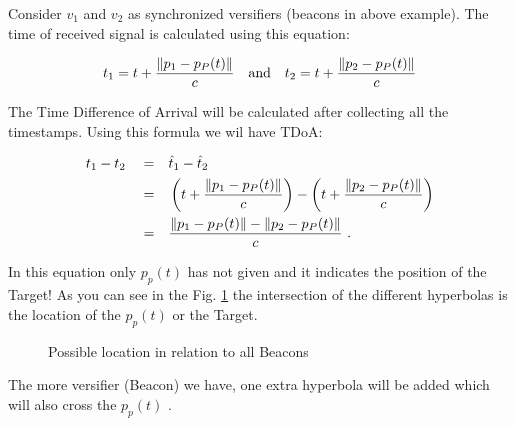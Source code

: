 Consider $v_1$ and $v_2$ as synchronized versifiers (beacons in above example). The time of received signal is calculated using this equation:

\begin{equation}
    \label{eqn:time_received_sig}
    t_1 = t + \frac{\norm{p_1-p_P(t)}}{c}
    \quad \text{and} \quad
    t_2 = t + \frac{\norm{p_2-p_P(t)}}{c}
\end{equation}

The Time Difference of Arrival will be calculated after collecting all the timestamps. Using this formula we wil have TDoA:

\begin{equation}
    \label{eqn:time_difference_arr}
    \begin{split}
        t_1 - t_2 \quad =& \quad \hat t_1 - \hat t_2 \\
        =& \quad \left(t+\frac{\norm{p_1-p_P(t)}}{c}\right) - \left(t+\frac{\norm{p_2-p_P(t)}}{c}\right)\\
        =& \quad \frac{\norm{p_1-p_P(t)} - \norm{p_2-p_P(t)}}{c} \ .
    \end{split}
\end{equation}

In this equation only $p_p(t)$ has not given and it indicates the position of the Target! As you can see in the Fig. \ref{fig:hyp_location} the intersection of the different hyperbolas is the location of the $p_p(t)$ or the Target. \cite{brian17}

\begin{figure}[htp]
    \centering
    \caption{Possible location in relation to all Beacons \cite{brian17}}
    \label{fig:hyp_location}
\end{figure}

The more versifier (Beacon) we have, one extra hyperbola will be added which will also cross the $p_p(t)$ \cite{schaefer18}.

